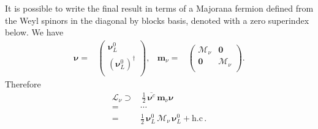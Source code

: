 It is possible to write the final result in terms of a Majorana fermion defined from the Weyl spinors in the diagonal by blocks basis, denoted with a zero superindex below. We have
\begin{align}
  \boldsymbol{\nu}=&
  \begin{pmatrix}
    \boldsymbol{\nu}_L^0\\
    \left( \boldsymbol{\nu}_L^0 \right)^{\dagger}\\
  \end{pmatrix},&       \boldsymbol{m}_{\nu}=& \begin{pmatrix}
                                      \boldsymbol{\mathcal{M}}_{\nu} & \boldsymbol{0} \\
                                      \boldsymbol{0} & \boldsymbol{\mathcal{M}}_{\nu}  \\
                                    \end{pmatrix}.
\end{align}
Therefore
\begin{align}
  \mathcal{L}_{\nu}\supset &\, \tfrac{1}{2}\,\overline{\boldsymbol{\nu}^c}\, \boldsymbol{m}_{\nu} \boldsymbol{\nu}   \nonumber\\
=& \cdots \nonumber\\
=&\tfrac{1}{2}\,\boldsymbol{\nu}_L^{0}\, \boldsymbol{\mathcal{M}}_{\nu}\,   \boldsymbol{\nu}_L^{0} +\text{h.c}\,.
\end{align}



